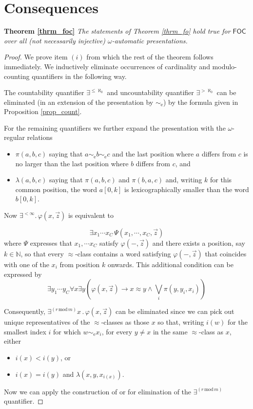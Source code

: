 \documentclass{stacs_proc}
\newcommand{\limp}{\rightarrow}
\newcommand{\Nat}{\mathbb{N}}
\newcommand{\FOC}{\mathsf{FOC}}
\newcommand{\eqe}{\sim_{\textrm{e}}}
\begin{document}
\vskip-0.7cm
\section{Consequences} 


\noindent
{\bf Theorem \ref{thrm_foc}}
{\it The statements of Theorem \ref{thrm_fo} hold true for $\FOC$ 
     over all (not necessarily injective) $\omega$-automatic presentations.}

\begin{proof}
We prove item $(i)$ from which the rest of the theorem 
follows immediately. We inductively eliminate occurrences of cardinality
and modulo-counting quantifiers in the following way.

The countability quantifier $\exists^{\leq \aleph_0}$ and uncountability
quantifier $\exists^{>\aleph_0}$ can be eliminated (in an extension of the
presentation by $\eqe$) by the formula given in Proposition \ref{prop_count}.  

For the remaining quantifiers we further expand the presentation with the 
$\omega$-regular relations
\begin{itemize}
\item $\pi(a,b,c)$ saying that $a \eqe b \eqe c$ and the last position where $a$
differs from $c$ is no larger than the last position where $b$ differs from
$c$, and
\item $\lambda(a,b,c)$ saying that $\pi(a,b,c)$ and $\pi(b,a,c)$ and, writing
$k$ for this common position, the word $a[0,k]$ is lexicographically smaller
than the word $b[0,k]$.
\end{itemize}

Now $\exists^{<\infty} . \, \varphi(x,\vec{z})$ is equivalent to

\[
\exists x_1 \cdots x_C \, \Psi(x_1,\cdots,x_C,\vec{z})
\]
where $\Psi$ expresses that $x_1, \cdots x_C$ satisfy  $\varphi(-,\vec{z})$ and
there exists a position, say $k \in \Nat$, so that every $\approx$-class contains a
word satisfying $\varphi(-,\vec{z})$ that coincides with one of the $x_i$ from
position $k$ onwards. This additional condition can be expressed
by 
\[
\exists y_1 \cdots y_C 
  \forall x 
    \exists y 
	\left( 
           \varphi(x,\vec{z})  \limp
	       x \approx y  \land  \bigvee_i \pi(y,y_i,x_i)
	\right)
\]

Consequently, $\exists^{(r\,\mathrm{mod}\,m)} x \, . \, \varphi(x,\vec{z})$ can be
eliminated since we can pick out unique representatives of the
$\approx$-classes as those $x$ so that, writing $i(w)$ for the smallest index $i$ 
for which $w \eqe x_i$, for every $y \neq x$ in the same $\approx$-class as $x$,
either 
\begin{itemize}
\item $i(x) < i(y)$, or
\item $i(x) = i(y)$ and $\lambda(x,y,x_{i(x)})$. 
\end{itemize} 
Now we can apply the construction of \cite{KL06} or \cite{KRS04} for elimination 
of the $\exists^{(r\,\mathrm{mod}\,m)}$ quantifier.
\end{proof}
\end{document}
